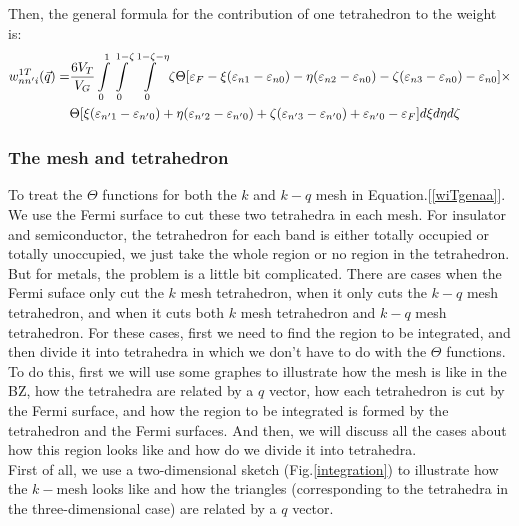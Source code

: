 \documentclass[10pt]{article}
\begin{document}
Then, the general formula for the contribution of one tetrahedron to the weight is:
\begin{eqnarray} 
{w_{nn'i}^{1T}}(\vec{q})=&\frac{6V_T}{V_G}%
\int\limits_0^1{\int\limits_0^{1-\zeta}{%
\int\limits_0^{1-\zeta-\eta}{\zeta \Theta[\varepsilon_F-\xi(\varepsilon_{n1}-\varepsilon_{n0})-%
\eta(\varepsilon_{n2}-\varepsilon_{n0})-
\zeta(\varepsilon_{n3}-\varepsilon_{n0})-\varepsilon_{n0}]\times}}}\nonumber\\
&\Theta[\xi(\varepsilon_{n'1}-\varepsilon_{n'0})+%
\eta(\varepsilon_{n'2}-\varepsilon_{n'0})+
 \zeta(\varepsilon_{n'3}-\varepsilon_{n'0})+\varepsilon_{n'0}-\varepsilon_F] d\xi d\eta d\zeta
\label{wiTgenaa}
\end{eqnarray}

\subsubsection{The mesh and tetrahedron}

To treat the $\Theta$ functions for both the $k$ and $k-q$ mesh in Equation.[\ref{wiTgenaa}]. We use the Fermi surface to cut these two tetrahedra in each mesh. For insulator and semiconductor, the tetrahedron for each band is either totally occupied or totally unoccupied, we just take the whole region or no region in the tetrahedron. But for metals, the problem is a little bit complicated. There are cases when the Fermi suface only cut the $k$ mesh tetrahedron, when it only cuts the $k-q$ mesh tetrahedron, and when it cuts both $k$ mesh tetrahedron and $k-q$ mesh tetrahedron. For these cases, first we need to find the region to be integrated, and then divide it into tetrahedra in which we don't have to do with the $\Theta$ functions.\\ 

To do this, first we will use some graphes to illustrate how the mesh is like in the BZ, how the tetrahedra are related by a $q$ vector, how each tetrahedron is cut by the Fermi surface, and how the region to be integrated is formed by the tetrahedron and the Fermi surfaces. And then, we will discuss all the cases about how this region looks like and how do we divide it into tetrahedra.  \\

First of all, we use a two-dimensional sketch (Fig.\ref{integration}) to illustrate how the $k-$mesh looks like and how the triangles (corresponding to the tetrahedra in the three-dimensional case) are related by a $q$ vector. \\
\end{document}
